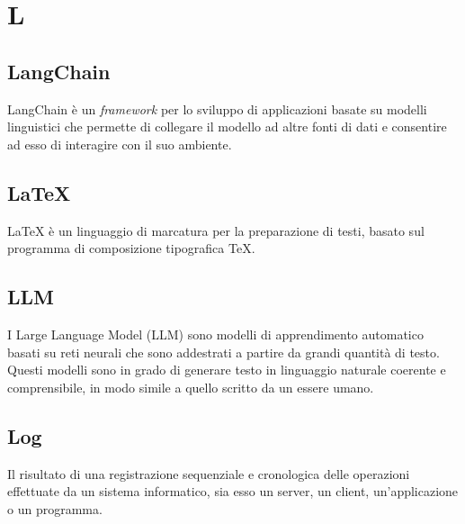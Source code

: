 \chapter{L}

\section{LangChain}
LangChain è un \emph{framework} per lo sviluppo di applicazioni basate su modelli linguistici che permette di collegare il modello ad altre fonti di dati e consentire ad esso di interagire con il suo ambiente.

\section{\LaTeX}
LaTeX è un linguaggio di marcatura per la preparazione di testi, basato sul programma di composizione tipografica \TeX.

\section{LLM}\label{sec:Large Language Model}
I Large Language Model (LLM) sono modelli di apprendimento automatico basati su reti neurali che sono addestrati a partire da grandi quantità di testo. Questi modelli sono in grado di generare testo in linguaggio naturale coerente e comprensibile, in modo simile a quello scritto da un essere umano.

\section{Log}
Il risultato di una registrazione sequenziale e cronologica delle operazioni effettuate da un sistema informatico, sia esso un server, un client, un'applicazione o un programma.
